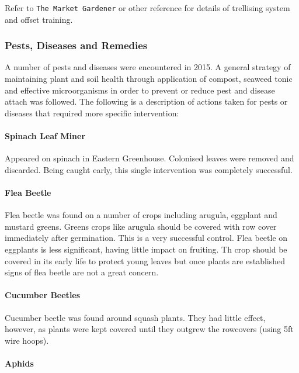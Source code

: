 Refer to \texttt{The Market Gardener} or other reference for details of
trellising system and offset training.

\subsubsection{Pests, Diseases and
Remedies}\label{pests-diseases-and-remedies}

A number of pests and diseases were encountered in 2015. A general
strategy of maintaining plant and soil health through application of
compost, seaweed tonic and effective microorganisms in order to prevent
or reduce pest and disease attach was followed. The following is a
description of actions taken for pests or diseases that required more
specific intervention:

\paragraph{Spinach Leaf Miner}\label{spinach-leaf-miner}

Appeared on spinach in Eastern Greenhouse. Colonised leaves were removed
and discarded. Being caught early, this single intervention was
completely successful.

\paragraph{Flea Beetle}\label{flea-beetle}

Flea beetle was found on a number of crops including arugula, eggplant
and mustard greens. Greens crops like arugula should be covered with row
cover immediately after germination. This is a very successful control.
Flea beetle on eggplants is less significant, having little impact on
fruiting. Th crop should be covered in its early life to protect young
leaves but once plants are established signs of flea beetle are not a
great concern.

\paragraph{Cucumber Beetles}\label{cucumber-beetles}

Cucumber beetle was found around squash plants. They had little effect,
however, as plants were kept covered until they outgrew the rowcovers
(using 5ft wire hoops).

\paragraph{Aphids}\label{aphids}

